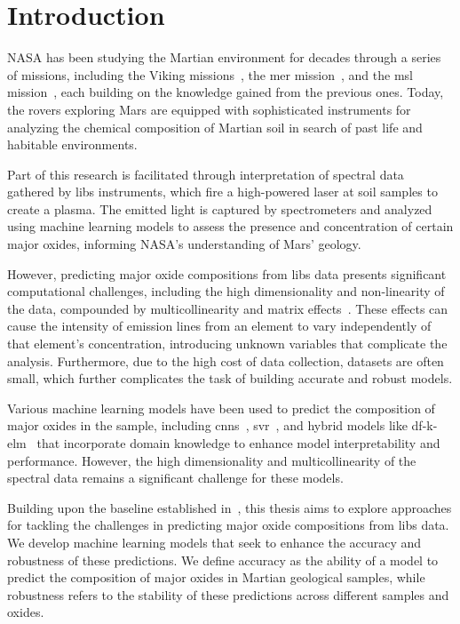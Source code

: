\section{Introduction}\label{sec:introduction}
NASA has been studying the Martian environment for decades through a series of missions, including the Viking missions~\cite{marsnasagov_vikings}, the \gls{mer} mission~\cite{marsnasagov_observer, marsnasagov_spirit_opportunity}, and the \gls{msl} mission~\cite{marsnasagov_msl}, each building on the knowledge gained from the previous ones.
Today, the rovers exploring Mars are equipped with sophisticated instruments for analyzing the chemical composition of Martian soil in search of past life and habitable environments.

Part of this research is facilitated through interpretation of spectral data gathered by \gls{libs} instruments, which fire a high-powered laser at soil samples to create a plasma.
The emitted light is captured by spectrometers and analyzed using machine learning models to assess the presence and concentration of certain major oxides, informing NASA's understanding of Mars' geology.

However, predicting major oxide compositions from \gls{libs} data presents significant computational challenges, including the high dimensionality and non-linearity of the data, compounded by multicollinearity and matrix effects~\cite{andersonImprovedAccuracyQuantitative2017}. 
These effects can cause the intensity of emission lines from an element to vary independently of that element's concentration, introducing unknown variables that complicate the analysis. 
Furthermore, due to the high cost of data collection, datasets are often small, which further complicates the task of building accurate and robust models.

Various machine learning models have been used to predict the composition of major oxides in the sample, including \glspl{cnn}~\cite{yang_laser-induced_2022, yangConvolutionalNeuralNetwork2022}, \gls{svr}~\cite{rezaei_dimensionality_reduction}, and hybrid models like \gls{df}-\gls{k-elm}~\cite{song_DF-K-ELM} that incorporate domain knowledge to enhance model interpretability and performance.
However, the high dimensionality and multicollinearity of the spectral data remains a significant challenge for these models.

Building upon the baseline established in~\citet{p9_paper}, this thesis aims to explore approaches for tackling the challenges in predicting major oxide compositions from \gls{libs} data. We develop machine learning models that seek to enhance the accuracy and robustness of these predictions.
We define accuracy as the ability of a model to predict the composition of major oxides in Martian geological samples, while robustness refers to the stability of these predictions across different samples and oxides.


